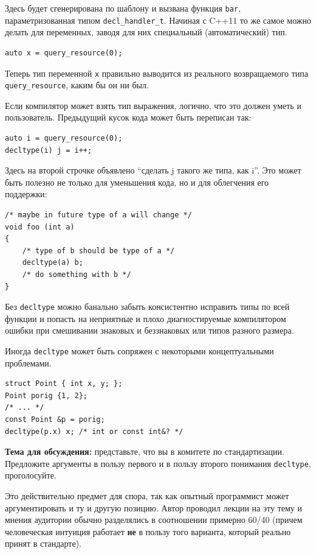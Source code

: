 \documentclass[a4paper,12pt,oneside]{article}
\begin{document}
Здесь будет сгенерирована по шаблону и вызвана функция \lstinline!bar!, параметризованная типом \lstinline!decl_handler_t!. Начиная с C++11 то же самое можно делать для переменных, заводя для них специальный (автоматический) тип.

\begin{lstlisting}
auto x = query_resource(0);
\end{lstlisting}

Теперь тип переменной \lstinline!x! правильно выводится из реального возвращаемого типа \lstinline!query_resource!, каким бы он ни был.

Если компилятор может взять тип выражения, логично, что это должен уметь и пользователь. Предыдущий кусок кода может быть переписан так:

\begin{lstlisting}
auto i = query_resource(0);
decltype(i) j = i++;
\end{lstlisting}

Здесь на второй строчке объявлено ``сделать j такого же типа, как i''. Это может быть полезно не только для уменьшения кода, но и для облегчения его поддержки:

\begin{lstlisting}
/* maybe in future type of a will change */
void foo (int a)
{
    /* type of b should be type of a */
    decltype(a) b;
    /* do something with b */
}
\end{lstlisting}

Без \lstinline!decltype! можно банально забыть консистентно исправить типы по всей функции и попасть на неприятные и плохо диагностируемые компилятором ошибки при смешивании знаковых и беззнаковых или типов разного размера.

Иногда \lstinline!decltype! может быть сопряжен с некоторыми концептуальными проблемами.

\begin{lstlisting}
struct Point { int x, y; };
Point porig {1, 2};
/* ... */
const Point &p = porig;
decltype(p.x) x; /* int or const int&? */
\end{lstlisting}

\textbf{Тема для обсуждения:} представьте, что вы в комитете по стандартизации. Предложите аргументы в пользу первого и в пользу второго понимания \lstinline!decltype!, проголосуйте.

Это действительно предмет для спора, так как опытный программист может аргументировать и ту и другую позицию. Автор проводил лекции на эту тему и мнения аудитории обычно разделялись в соотношении примерно 60/40 (причем человеческая интуиция работает \textbf{не} в пользу того варианта, который реально принят в стандарте).
\end{document}
